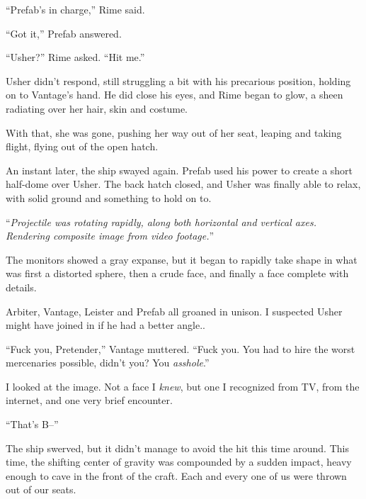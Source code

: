 ``Prefab's in charge,'' Rime said.



``Got it,'' Prefab answered.



``Usher?'' Rime asked.  ``Hit me.''



Usher didn't respond, still struggling a bit with his precarious position, holding on to Vantage's hand.  He did close his eyes, and Rime began to glow, a sheen radiating over her hair, skin and costume.



With that, she was gone, pushing her way out of her seat, leaping and taking flight, flying out of the open hatch.



An instant later, the ship swayed again.  Prefab used his power to create a short half-dome over Usher.  The back hatch closed, and Usher was finally able to relax, with solid ground and something to hold on to.



``\emph{Projectile was rotating rapidly, along both horizontal and vertical axes.  Rendering composite image from video footage.}''



The monitors showed a gray expanse, but it began to rapidly take shape in what was first a distorted sphere, then a crude face, and finally a face complete with details.



Arbiter, Vantage, Leister and Prefab all groaned in unison.  I suspected Usher might have joined in if he had a better angle..



``Fuck you, Pretender,'' Vantage muttered.  ``Fuck you.  You had to hire the worst mercenaries possible, didn't you?  You \emph{asshole}.''



I looked at the image.  Not a face I \emph{knew}, but one I recognized from TV, from the internet, and one very brief encounter.



``That's B--''



The ship swerved, but it didn't manage to avoid the hit this time around.  This time, the shifting center of gravity was compounded by a sudden impact, heavy enough to cave in the front of the craft.  Each and every one of us were thrown out of our seats.



